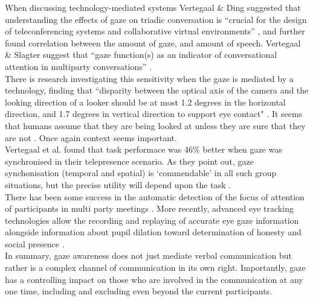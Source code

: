 When discussing technology-mediated systems Vertegaal \& Ding suggested that understanding the effects of gaze on triadic conversation is ``crucial for the design of teleconferencing systems and collaborative virtual environments'' \cite{Vertegaal2002}, and further found correlation between the amount of gaze, and amount of speech. Vertegaal \& Slagter suggest that ``gaze function(s) as an indicator of conversational attention in multiparty conversations'' \cite{Vertegaal2001}. \\        
 There is research investigating this sensitivity when the gaze is mediated by a technology, finding that ``disparity between the optical axis of the camera and the looking direction of a looker should be at most 1.2 degrees in the horizontal direction, and 1.7 degrees in vertical direction to support eye contact" \cite{Eijk2010, Bock2008}. It seems that humans assume that they are being looked at unless they are sure that they are not \cite{Chen2002}. Once again context seems important.\\
Vertegaal et al. found that task performace was 46\% better when gaze was synchronised in their telepresence scenario. As they point out, gaze synchonisation (temporal and spatial) is `commendable' in all such group situations, but the precise utility will depend upon the task \cite{Vertegaal2002}.\\
There has been some success in the automatic detection of the focus of attention of participants in multi party meetings \cite{Stiefelhagen2001, Stiefelhagen2002}.  More recently, advanced eye tracking technologies allow the recording and replaying of accurate eye gaze information \cite{Steptoe2009} alongside information about pupil dilation toward determination of honesty and social presence \cite{Steptoe2010a}.\\               
In summary, gaze awareness does not just mediate verbal communication but rather is a complex channel of communication in its own right. Importantly, gaze has a controlling impact on those who are involved in the communication at any one time, including and excluding even beyond the current participants. \\
